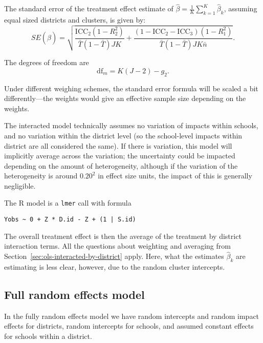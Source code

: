 \documentclass[12pt]{article}
\begin{document}
The standard error of the treatment effect estimate of $\hat{\beta} = \frac{1}{K} \sum_{k=1}^K \hat{\beta}_k$, assuming equal sized districts and clusters, is given by: \[
SE( \hat{\beta} ) = \sqrt{
\frac{\text{ICC}_{2}(1 - R^2_{2})}{\bar{T}(1 - \bar{T}) JK} +
\frac{(1-\text{ICC}_{2} - \text{ICC}_{3})(1-R^2_{1})}{\bar{T}(1 - \bar{T}) J K\bar{n}} }.
\]

The degrees of freedom are \[
\text{df}_m = K( J - 2) - g_{2}.
\]

Under different weighing schemes, the standard error formula will be scaled a bit differently---the weights would give an effective sample size depending on the weights.

The interacted model technically assumes no variation of impacts within schools, and no variation within the district level (so the school-level impacts within district are all considered the same).
If there is variation, this model will implicitly average across the variation; the uncertainty could be impacted depending on the amount of heterogeneity, although if the variation of the heterogeneity is around $0.20^2$ in effect size units, the impact of this is generally negligible.

The R model is a \texttt{lmer} call with formula
\begin{verbatim}
Yobs ~ 0 + Z * D.id - Z + (1 | S.id)
\end{verbatim}

The overall treatment effect is then the average of the treatment by district interaction terms.
All the questions about weighting and averaging from Section~\ref{sec:ols-interacted-by-district} apply.
Here, what the estimates $\widehat{\beta}_k$ are estimating is less clear, however, due to the random cluster intercepts.



\subsection{Full random effects model}\label{sec:full-random-effects-model}

In the fully random effects model we have random intercepts and random impact effects for
districts, random intercepts for schools, and assumed constant effects for schools
within a district.
\end{document}
